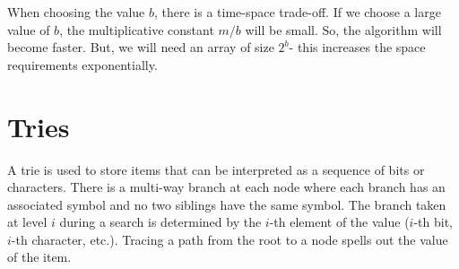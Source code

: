 \documentclass[a4paper, openany]{memoir}
\begin{document}
When choosing the value $b$, there is a time-space trade-off. If we choose a large value of $b$, the multiplicative constant $m/b$ will be small. So, the algorithm will become faster. But, we will need an array of size $2^b$- this increases the space requirements exponentially.
\newpage

\section{Tries}
A trie is used to store items that can be interpreted as a sequence of bits or characters. There is a multi-way branch at each node where each branch has an associated symbol and no two siblings have the same symbol. The branch taken at level $i$ during a search is determined by the $i$-th element of the value ($i$-th bit, $i$-th character, etc.). Tracing a path from the root to a node spells out the value of the item. 
\end{document}
